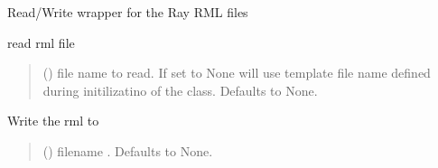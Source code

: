 \documentclass[letterpaper,10pt,english]{sphinxmanual}
\begin{document}
\begin{fulllineitems}
\label{\detokenize{code_documentation:raypyng.rml.RMLFile}}
\pysigstartsignatures
{}
\pysigstopsignatures
\sphinxAtStartPar
Read/Write wrapper for the Ray RML files

\begin{fulllineitems}
\label{\detokenize{code_documentation:raypyng.rml.RMLFile.read}}
\pysigstartsignatures
{}
\pysigstopsignatures
\sphinxAtStartPar
read rml file
\begin{quote}\begin{description}
\sphinxAtStartPar
{} (\sphinxstyleliteralemphasis{\sphinxupquote{, }}) \textendash{} file name to read. If set to None will use template file name defined during initilizatino of the class. Defaults to None.

\end{description}\end{quote}

\end{fulllineitems}


\begin{fulllineitems}
\label{\detokenize{code_documentation:raypyng.rml.RMLFile.write}}
\pysigstartsignatures
{}
\pysigstopsignatures
\sphinxAtStartPar
Write the rml to 
\begin{quote}\begin{description}
\sphinxAtStartPar
{} (\sphinxstyleliteralemphasis{\sphinxupquote{, }}) \textendash{} filename . Defaults to None.


\end{description}
\end{quote}
\end{fulllineitems}
\end{fulllineitems}
\end{document}
